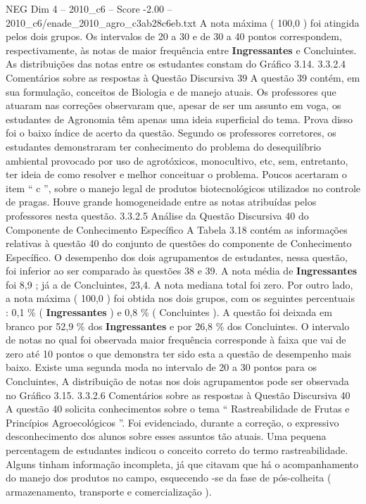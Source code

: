 \begin{textsample}{NEG Dim 4 – 2010\_c6 – Score -2.00 – 2010\_c6/enade\_2010\_agro\_c3ab28c6eb.txt}
A nota máxima ( 100,0 ) foi atingida pelos dois grupos.
Os intervalos de 20 a 30 e de 30 a 40 pontos correspondem, respectivamente, às notas de maior frequência entre \textbf{Ingressantes} e Concluintes.
As distribuições das notas entre os estudantes constam do Gráfico 3.14. 3.3.2.4 Comentários sobre as respostas à Questão Discursiva 39 A questão 39 contém, em sua formulação, conceitos de Biologia e de manejo atuais.
Os professores que atuaram nas correções observaram que, apesar de ser um assunto em voga, os estudantes de Agronomia têm apenas uma ideia superficial do tema.
Prova disso foi o baixo índice de acerto da questão.
Segundo os professores corretores, os estudantes demonstraram ter conhecimento do problema do desequilíbrio ambiental provocado por uso de agrotóxicos, monocultivo, etc, sem, entretanto, ter ideia de como resolver e melhor conceituar o problema.
Poucos acertaram o item “ c ”, sobre o manejo legal de produtos biotecnológicos utilizados no controle de pragas.
Houve grande homogeneidade entre as notas atribuídas pelos professores nesta questão. 3.3.2.5 Análise da Questão Discursiva 40 do Componente de Conhecimento Específico A Tabela 3.18 contém as informações relativas à questão 40 do conjunto de questões do componente de Conhecimento Específico.
O desempenho dos dois agrupamentos de estudantes, nessa questão, foi inferior ao ser comparado às questões 38 e 39.
A nota média de \textbf{Ingressantes} foi 8,9 ; já a de Concluintes, 23,4.
A nota mediana total foi zero.
Por outro lado, a nota máxima ( 100,0 ) foi obtida nos dois grupos, com os seguintes percentuais : 0,1 \% ( \textbf{Ingressantes} ) e 0,8 \% ( Concluintes ).
A questão foi deixada em branco por 52,9 \% dos \textbf{Ingressantes} e por 26,8 \% dos Concluintes.
O intervalo de notas no qual foi observada maior frequência corresponde à faixa que vai de zero até 10 pontos o que demonstra ter sido esta a questão de desempenho mais baixo.
Existe uma segunda moda no intervalo de 20 a 30 pontos para os Concluintes, A distribuição de notas nos dois agrupamentos pode ser observada no Gráfico 3.15. 3.3.2.6 Comentários sobre as respostas à Questão Discursiva 40 A questão 40 solicita conhecimentos sobre o tema “ Rastreabilidade de Frutas e Princípios Agroecológicos ”.
Foi evidenciado, durante a correção, o expressivo desconhecimento dos alunos sobre esses assuntos tão atuais.
Uma pequena percentagem de estudantes indicou o conceito correto do termo rastreabilidade.
Alguns tinham informação incompleta, já que citavam que há o acompanhamento do manejo dos produtos no campo, esquecendo -se da fase de pós-colheita ( armazenamento, transporte e comercialização ).

\end{textsample}
